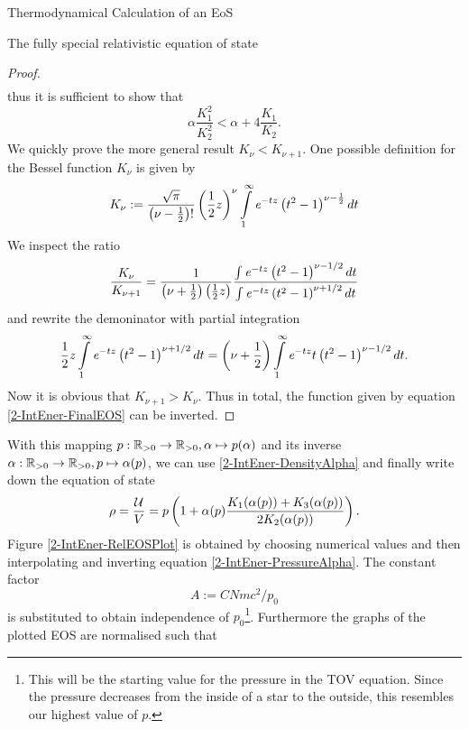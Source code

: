 \begin{section}{Thermodynamical Calculation of an EoS}
\begin{subsection}{The fully special relativistic equation of state}
\begin{proof}
\begin{align}
	\end{align}
	thus it is sufficient to show that
	\begin{equation}
		\alpha\frac{K_1^2}{K_2^2}  < \alpha + 4\frac{K_1}{K_2}.
	\end{equation}
	We quickly prove the more general result $K_\nu<K_{\nu+1}$. One possible definition\cite{abramowitzPocketbookMathematicalFunctions1984} for the Bessel function $K_\nu$ is given by
	\begin{equation}
		K_\nu := \frac{\sqrt{\pi}}{\left(\nu-\frac{1}{2}\right)!}\left(\frac{1}{2}z\right)^\nu\int\limits_1^\infty\mathit{e}^{-tz}\left(t^2-1\right)^{\nu-\frac{1}{2}}dt
	\end{equation}
	We inspect the ratio
	\begin{equation}
		\frac{K_\nu}{K_{\nu+1}} = \frac{1}{\left(\nu+\frac{1}{2}\right)\left(\frac{1}{2}z\right)}\frac{\int\mathit{e}^{-tz}\left(t^2-1\right)^{\nu-1/2}dt}{\int\mathit{e}^{-tz}\left(t^2-1\right)^{\nu+1/2}dt}
	\end{equation}
	and rewrite the demoninator with partial integration
	\begin{equation}
		 \frac{1}{2}z\int\limits_1^\infty\mathit{e}^{-tz}\left(t^2-1\right)^{\nu+1/2}dt = \left(\nu+\frac{1}{2}\right)\int\limits_1^\infty \mathit{e}^{-tz}t\left(t^2-1\right)^{\nu-1/2}dt.
	\end{equation}
	Now it is obvious that $K_{\nu+1}>K_\nu$. Thus in total, the function given by equation \ref{2-IntEner-FinalEOS} can be inverted.
\end{proof}%
%
%
\noindent With this mapping $p:\mathbb{R}_{>0}\rightarrow \mathbb{R}_{>0},\alpha\mapsto p(\alpha)$ and its inverse $\alpha:\mathbb{R}_{>0}\rightarrow \mathbb{R}_{>0},p\mapsto \alpha(p)$, we can use \ref{2-IntEner-DensityAlpha} and finally write down the equation of state 
\begin{equation}
	\rho = \frac{\mathcal{U}}{V} = p\left(1+\alpha(p)\frac{K_1(\alpha(p))+K_3(\alpha(p))}{2K_2(\alpha(p))}\right).
	\label{2-IntEner-FinalEOS}
\end{equation}
Figure \ref{2-IntEner-RelEOSPlot} is obtained by choosing numerical values and then interpolating and inverting equation \ref{2-IntEner-PressureAlpha}. The constant factor 
\begin{equation}
	A:=CNmc^2/p_0
	\label{2-IntEner-FactorExplanation}
\end{equation}
is substituted to obtain independence of $p_0$\footnote{This will be the starting value for the pressure in the TOV equation. Since the pressure decreases from the inside of a star to the outside, this resembles our highest value of $p$.}. Furthermore the graphs of the plotted EOS are normalised such that

\end{subsection}
\end{section}
